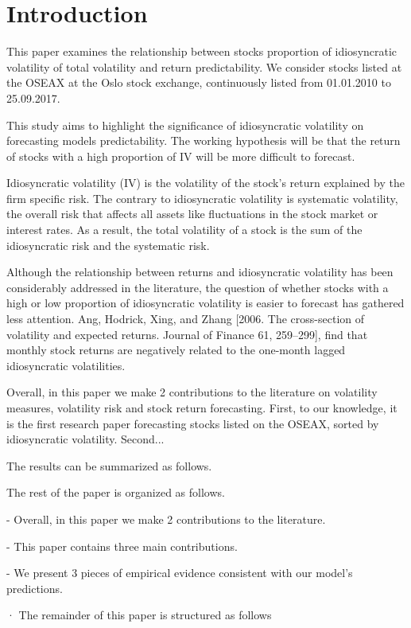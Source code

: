 \chapter{Introduction}

This paper examines the relationship between stocks proportion of idiosyncratic volatility of total volatility and return predictability. We consider stocks listed at the OSEAX at the Oslo stock exchange, continuously listed from 01.01.2010 to 25.09.2017. 

This  study  aims  to highlight the significance of idiosyncratic volatility on forecasting models predictability. The working hypothesis will be that the return of stocks with a high proportion of IV will be more difficult to forecast. 
 
Idiosyncratic volatility (IV) is the volatility of the stock's return explained by the firm specific risk. The contrary to idiosyncratic volatility is systematic volatility, the overall risk that affects all assets like fluctuations in the stock market or interest rates. As a result, the total volatility of a stock is the sum of the idiosyncratic risk and the systematic risk. 

Although  the  relationship between returns and idiosyncratic volatility has been  considerably addressed  in the  literature, the question of whether stocks with a high or low proportion of idiosyncratic volatility is easier to forecast has gathered less attention. Ang, Hodrick, Xing, and Zhang [2006. The cross-section of volatility and expected returns. Journal of Finance 61, 259–299], find that monthly stock returns are negatively related to the one-month lagged idiosyncratic volatilities.

Overall, in this paper we make 2 contributions to the literature  on  volatility  measures, volatility  risk and  stock  return forecasting.  First,  to our knowledge, it  is  the first research paper forecasting stocks listed on the OSEAX, sorted by idiosyncratic volatility. Second...

The results can be summarized as follows. 

The rest of the paper is organized as follows. 

- Overall, in this paper we make 2 contributions to the literature.

- This paper contains three main contributions.

- We present 3 pieces of empirical evidence consistent with our model’s predictions.

· The remainder of this paper is structured as follows